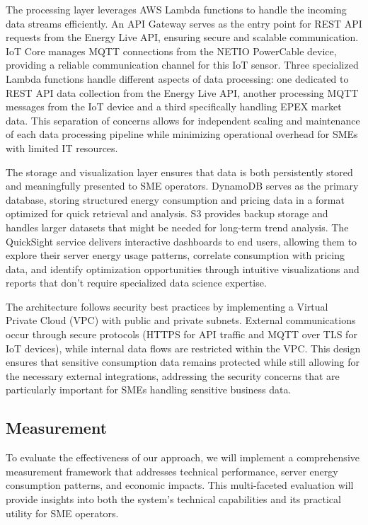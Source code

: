 The processing layer leverages AWS Lambda functions to handle the incoming data streams
efficiently. An API Gateway serves as the entry point for REST API requests from the Energy Live API,
ensuring secure and scalable communication. IoT Core manages MQTT connections from the NETIO
PowerCable device, providing a reliable communication channel for this IoT sensor.
Three specialized Lambda functions handle different aspects of data processing: one dedicated to
REST API data collection from the Energy Live API, another processing MQTT messages from the IoT device
and a third specifically handling EPEX market data. This separation of concerns allows for
independent scaling and maintenance of each data processing pipeline while minimizing operational
overhead for SMEs with limited IT resources.

The storage and visualization layer ensures that data is both persistently stored and meaningfully
presented to SME operators. DynamoDB serves as the primary database, storing structured energy
consumption and pricing data in a format optimized for quick retrieval and analysis. S3 provides
backup storage and handles larger datasets that might be needed for long-term trend analysis. The
QuickSight service delivers interactive dashboards to end users, allowing them to explore their
server energy usage patterns, correlate consumption with pricing data, and identify optimization
opportunities through intuitive visualizations and reports that don't require specialized data
science expertise.

The architecture follows security best practices by implementing a Virtual Private Cloud (VPC) with
public and private subnets. External communications occur through secure protocols
(HTTPS for API traffic and MQTT over TLS for IoT devices), while internal data flows are restricted
within the VPC. This design ensures that sensitive consumption data remains protected while still
allowing for the necessary external integrations, addressing the security concerns that are
particularly important for SMEs handling sensitive business data.

\subsection{Measurement}
To evaluate the effectiveness of our approach, we will implement a comprehensive
measurement framework that addresses technical performance, server energy
consumption patterns, and economic impacts. This multi-faceted evaluation will
provide insights into both the system's technical capabilities and its practical
utility for SME operators.

